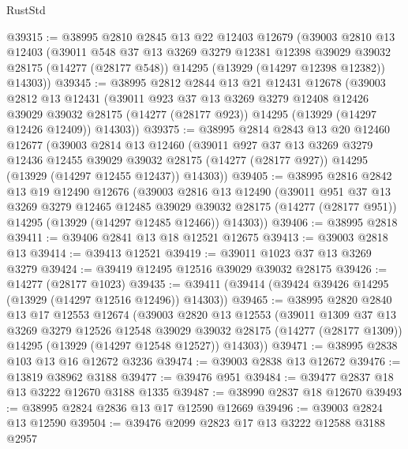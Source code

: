 \begin{lexlean}{RustStd}
\begin{coremodule}
@39315 := @38995
    @2810
    @2845
    @13
    @22
    @12403
    @12679
    (@39003
      @2810
      @13
      @12403
      (@39011
        @548
        @37
        @13
        @3269
        @3279
        @12381
        @12398
        @39029
        @39032
        @28175
        (@14277 (@28177 @548))
        @14295
        (@13929 (@14297 @12398 @12382))
        @14303))
@39345 := @38995
    @2812
    @2844
    @13
    @21
    @12431
    @12678
    (@39003
      @2812
      @13
      @12431
      (@39011
        @923
        @37
        @13
        @3269
        @3279
        @12408
        @12426
        @39029
        @39032
        @28175
        (@14277 (@28177 @923))
        @14295
        (@13929 (@14297 @12426 @12409))
        @14303))
@39375 := @38995
    @2814
    @2843
    @13
    @20
    @12460
    @12677
    (@39003
      @2814
      @13
      @12460
      (@39011
        @927
        @37
        @13
        @3269
        @3279
        @12436
        @12455
        @39029
        @39032
        @28175
        (@14277 (@28177 @927))
        @14295
        (@13929 (@14297 @12455 @12437))
        @14303))
@39405 := @38995
    @2816
    @2842
    @13
    @19
    @12490
    @12676
    (@39003
      @2816
      @13
      @12490
      (@39011
        @951
        @37
        @13
        @3269
        @3279
        @12465
        @12485
        @39029
        @39032
        @28175
        (@14277 (@28177 @951))
        @14295
        (@13929 (@14297 @12485 @12466))
        @14303))
@39406 := @38995 @2818
@39411 := @39406 @2841 @13 @18 @12521 @12675
@39413 := @39003 @2818 @13
@39414 := @39413 @12521
@39419 := @39011 @1023 @37 @13 @3269 @3279
@39424 := @39419 @12495 @12516 @39029 @39032 @28175
@39426 := @14277 (@28177 @1023)
@39435 := @39411 (@39414 (@39424 @39426 @14295 (@13929 (@14297 @12516 @12496)) @14303))
@39465 := @38995
    @2820
    @2840
    @13
    @17
    @12553
    @12674
    (@39003
      @2820
      @13
      @12553
      (@39011
        @1309
        @37
        @13
        @3269
        @3279
        @12526
        @12548
        @39029
        @39032
        @28175
        (@14277 (@28177 @1309))
        @14295
        (@13929 (@14297 @12548 @12527))
        @14303))
@39471 := @38995 @2838 @103 @13 @16 @12672 @3236
@39474 := @39003 @2838 @13 @12672
@39476 := @13819 @38962 @3188
@39477 := @39476 @951
@39484 := @39477 @2837 @18 @13 @3222 @12670 @3188 @1335
@39487 := @38990 @2837 @18 @12670
@39493 := @38995 @2824 @2836 @13 @17 @12590 @12669
@39496 := @39003 @2824 @13 @12590
@39504 := @39476 @2099 @2823 @17 @13 @3222 @12588 @3188 @2957

\end{coremodule}
\end{lexlean}
